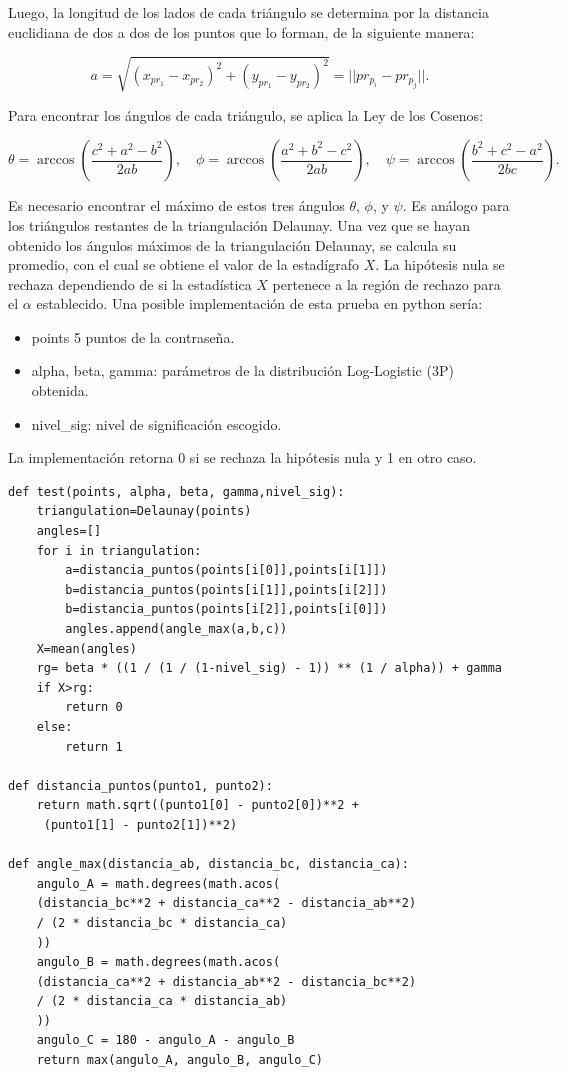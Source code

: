 \documentclass[12pt]{report}
\begin{document}
Luego, la longitud de los lados de cada triángulo se determina por la distancia euclidiana de dos a dos de los puntos que lo forman, de la siguiente manera:

\[
a = \sqrt{(x_{pr_1} - x_{pr_2})^2 + (y_{pr_1} - y_{pr_2})^2} = ||pr_{p_i} - pr_{p_j}||.
\]

Para encontrar los ángulos de cada triángulo, se aplica la Ley de los Cosenos:

\[
\theta = \arccos\left(\frac{c^2 + a^2 - b^2}{2ab}\right), \quad \phi = \arccos\left(\frac{a^2 + b^2 - c^2}{2ab}\right), \quad \psi = \arccos\left(\frac{b^2 + c^2 - a^2}{2bc}\right).
\]

Es necesario encontrar el máximo de estos tres ángulos \(\theta\), \(\phi\), y \(\psi\). Es análogo para los triángulos restantes de la triangulación Delaunay. Una vez que se hayan obtenido los ángulos máximos de la triangulación Delaunay, se calcula su promedio, con el cual se obtiene el valor de la estadígrafo \(X\). La hipótesis nula se rechaza dependiendo de si la estadística \(X\) pertenece a la región de rechazo para el \(\alpha\) establecido. Una posible implementación de esta prueba en python sería:

\begin{itemize}
	\item points 5 puntos de la contraseña.
	\item alpha, beta, gamma: parámetros de la distribución Log-Logistic (3P) obtenida.
	\item nivel\_sig: nivel de significación escogido.
	
\end{itemize}
La implementación retorna 0 si se rechaza la hipótesis nula y 1 en otro caso. 





\begin{lstlisting}
def test(points, alpha, beta, gamma,nivel_sig):
	triangulation=Delaunay(points)
	angles=[]
	for i in triangulation:
		a=distancia_puntos(points[i[0]],points[i[1]])
		b=distancia_puntos(points[i[1]],points[i[2]])
		b=distancia_puntos(points[i[2]],points[i[0]])
		angles.append(angle_max(a,b,c))     
	X=mean(angles) 
	rg= beta * ((1 / (1 / (1-nivel_sig) - 1)) ** (1 / alpha)) + gamma
	if X>rg:
		return 0
	else:
		return 1

def distancia_puntos(punto1, punto2):
	return math.sqrt((punto1[0] - punto2[0])**2 +
	 (punto1[1] - punto2[1])**2)

def angle_max(distancia_ab, distancia_bc, distancia_ca):
	angulo_A = math.degrees(math.acos(
	(distancia_bc**2 + distancia_ca**2 - distancia_ab**2) 
	/ (2 * distancia_bc * distancia_ca)
	))
	angulo_B = math.degrees(math.acos(
	(distancia_ca**2 + distancia_ab**2 - distancia_bc**2) 
	/ (2 * distancia_ca * distancia_ab)
	))
	angulo_C = 180 - angulo_A - angulo_B  
	return max(angulo_A, angulo_B, angulo_C)
\end{lstlisting}
\end{document}
